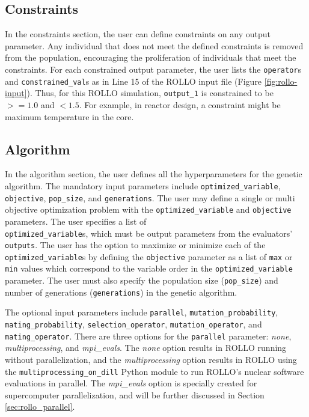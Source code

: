\subsection{Constraints}
In the constraints section, the user can define constraints on any output parameter. 
Any individual that does not meet the defined constraints is removed from the 
population, encouraging the proliferation of individuals that meet the 
constraints. 
For each constrained output parameter, the user lists the \texttt{operator}s 
and \texttt{constrained\_val}s as in Line 15 of the \gls{ROLLO} input file 
(Figure \ref{fig:rollo-input}). 
Thus, for this \gls{ROLLO} simulation, \texttt{output\_1} is constrained to be 
$>= 1.0$ and $< 1.5$. 
For example, in reactor design, a constraint might be maximum temperature in the 
core.

\subsection{Algorithm}
In the algorithm section, the user defines all the hyperparameters for the 
genetic algorithm. 
The mandatory input parameters include \texttt{optimized\_variable}, 
\texttt{objective}, \texttt{pop\_size}, and \texttt{generations}.
The user may define a single or multi objective optimization problem with 
the \texttt{optimized\_variable} and \texttt{objective} parameters.
The user specifies a list of \\ \texttt{optimized\_variable}s, which must be
output parameters from the evaluators' \texttt{outputs}. 
The user has the option to maximize or minimize each of the 
\texttt{optimized\_variable}s by defining the \texttt{objective} parameter as 
a list of \texttt{max} or \texttt{min} values which correspond to the variable 
order in the \texttt{optimized\_variable} parameter.
The user must also specify the population size (\texttt{pop\_size}) and number 
of generations (\texttt{generations}) in the genetic algorithm. 

The optional input parameters include \texttt{parallel}, 
\texttt{mutation\_probability}, \\ \texttt{mating\_probability}, 
\texttt{selection\_operator}, \texttt{mutation\_operator}, 
and \texttt{mating\_operator}. 
There are three options for the \texttt{parallel} parameter: \textit{none}, 
\textit{multiprocessing}, and \textit{mpi\_evals}.
The \textit{none} option results in \gls{ROLLO} running without parallelization, and
the \textit{multiprocessing} option results in \gls{ROLLO} using the 
\texttt{multiprocessing\_on\_dill} Python module to run ROLLO's nuclear software 
evaluations in parallel.
The \textit{mpi\_evals} option is specially created for supercomputer 
parallelization, and will be further discussed in Section \ref{sec:rollo_parallel}.

